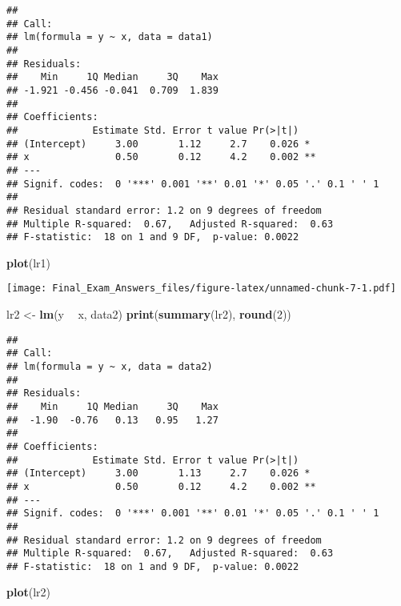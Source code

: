 \documentclass[]{article}
\newenvironment{Shaded}{\begin{snugshade}}{\end{snugshade}}
\newcommand{\KeywordTok}[1]{\textcolor[rgb]{0.13,0.29,0.53}{\textbf{#1}}}
\newcommand{\DecValTok}[1]{\textcolor[rgb]{0.00,0.00,0.81}{#1}}
\newcommand{\StringTok}[1]{\textcolor[rgb]{0.31,0.60,0.02}{#1}}
\newcommand{\OperatorTok}[1]{\textcolor[rgb]{0.81,0.36,0.00}{\textbf{#1}}}
\newcommand{\NormalTok}[1]{#1}
\begin{document}
\begin{verbatim}
## 
## Call:
## lm(formula = y ~ x, data = data1)
## 
## Residuals:
##    Min     1Q Median     3Q    Max 
## -1.921 -0.456 -0.041  0.709  1.839 
## 
## Coefficients:
##             Estimate Std. Error t value Pr(>|t|)   
## (Intercept)     3.00       1.12     2.7    0.026 * 
## x               0.50       0.12     4.2    0.002 **
## ---
## Signif. codes:  0 '***' 0.001 '**' 0.01 '*' 0.05 '.' 0.1 ' ' 1
## 
## Residual standard error: 1.2 on 9 degrees of freedom
## Multiple R-squared:  0.67,   Adjusted R-squared:  0.63 
## F-statistic:  18 on 1 and 9 DF,  p-value: 0.0022
\end{verbatim}

\begin{Shaded}
\begin{Highlighting}[]
\KeywordTok{plot}\NormalTok{(lr1)}
\end{Highlighting}
\end{Shaded}

\texttt{[image: Final\_Exam\_Answers\_files/figure-latex/unnamed-chunk-7-1.pdf]}

\begin{Shaded}
\begin{Highlighting}[]
\NormalTok{lr2 <-}\StringTok{ }\KeywordTok{lm}\NormalTok{(y }\OperatorTok{~}\StringTok{ }\NormalTok{x, data2)}
\KeywordTok{print}\NormalTok{(}\KeywordTok{summary}\NormalTok{(lr2), }\KeywordTok{round}\NormalTok{(}\DecValTok{2}\NormalTok{))}
\end{Highlighting}
\end{Shaded}

\begin{verbatim}
## 
## Call:
## lm(formula = y ~ x, data = data2)
## 
## Residuals:
##    Min     1Q Median     3Q    Max 
##  -1.90  -0.76   0.13   0.95   1.27 
## 
## Coefficients:
##             Estimate Std. Error t value Pr(>|t|)   
## (Intercept)     3.00       1.13     2.7    0.026 * 
## x               0.50       0.12     4.2    0.002 **
## ---
## Signif. codes:  0 '***' 0.001 '**' 0.01 '*' 0.05 '.' 0.1 ' ' 1
## 
## Residual standard error: 1.2 on 9 degrees of freedom
## Multiple R-squared:  0.67,   Adjusted R-squared:  0.63 
## F-statistic:  18 on 1 and 9 DF,  p-value: 0.0022
\end{verbatim}

\begin{Shaded}
\begin{Highlighting}[]
\KeywordTok{plot}\NormalTok{(lr2)}
\end{Highlighting}
\end{Shaded}
\end{document}
